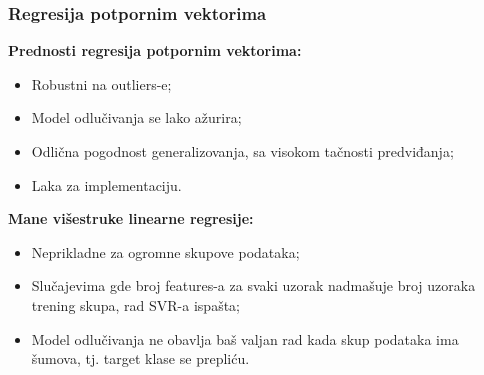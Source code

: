 \documentclass[fontsize=12bp, paper=a4]{scrarticle}
\begin{document}
\subsubsection{Regresija potpornim vektorima}
\textbf{Prednosti regresija potpornim vektorima:\cite{svr}} 
\begin{itemize}
    
    
    \item  Robustni na outliers-e;
    \item Model odlučivanja se lako ažurira;
    \item Odlična pogodnost generalizovanja, sa visokom tačnosti predviđanja;
    \item Laka za implementaciju.
\end{itemize}

\textbf{Mane višestruke linearne regresije:}
\begin{itemize}


    \item Neprikladne za ogromne skupove podataka;
    \item Slučajevima gde broj features-a za svaki uzorak nadmašuje broj uzoraka trening skupa, rad SVR-a ispašta;
    \item Model odlučivanja ne obavlja baš valjan rad kada skup podataka ima šumova, tj. target klase se prepliću.
\end{itemize}
\newpage
\end{document}
